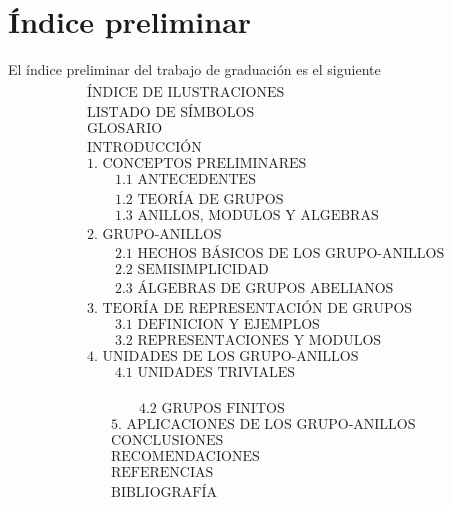 \documentclass[12pt,letterpaper,titlepage]{article}
\begin{document}
\newpage

\section{Índice preliminar}
El índice preliminar del trabajo de graduación es el siguiente
\begin{align*}
&\text{ÍNDICE DE ILUSTRACIONES}\\
&\text{LISTADO DE SÍMBOLOS}\\
&\text{GLOSARIO}\\
&\text{INTRODUCCIÓN}\\
&\text{1. CONCEPTOS PRELIMINARES}\\
&\qquad\text{1.1 ANTECEDENTES}\\
&\qquad\text{1.2 TEORÍA DE GRUPOS}\\
&\qquad\text{1.3 ANILLOS, MODULOS Y ALGEBRAS}\\
&\text{2. GRUPO-ANILLOS}\\
&\qquad\text{2.1 HECHOS BÁSICOS DE LOS GRUPO-ANILLOS}\\
&\qquad\text{2.2 SEMISIMPLICIDAD}\\
&\qquad\text{2.3 ÁLGEBRAS DE GRUPOS ABELIANOS}\\
&\text{3. TEORÍA DE REPRESENTACIÓN DE GRUPOS }\\
&\qquad\text{3.1 DEFINICION Y EJEMPLOS}\\
&\qquad\text{3.2 REPRESENTACIONES Y MODULOS}\\
&\text{4. UNIDADES DE LOS GRUPO-ANILLOS }\\
&\qquad\text{4.1 UNIDADES TRIVIALES}\\
\end{align*}

\newpage
\begin{align*}
&\qquad\text{4.2 GRUPOS FINITOS}\\
&\text{5. APLICACIONES DE LOS GRUPO-ANILLOS }\\
&\text{CONCLUSIONES}\\
&\text{RECOMENDACIONES}\\ %
&\text{REFERENCIAS}\\ %
&\text{BIBLIOGRAFÍA} %
\end{align*}

\newpage
\end{document}
